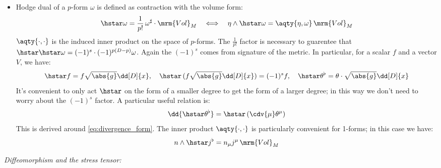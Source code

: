 \documentclass[a4paper
	,10pt
]{article}
\begin{document}
\begin{itemize}
	\item Hodge dual of a $p$-form $\omega$ is defined as contraction with the volume form:
	\begin{equation}
		\hstar\omega
		= \frac{1}{p!}\,
			\omega^\sharp \cdot \mrm{Vol}_M
	\quad\Longleftrightarrow\quad
		\eta\wedge \hstar\omega
		= \aqty{\eta,\omega} \,\mrm{Vol}_M
	\end{equation}
	$\aqty{\cdot,\cdot}$ is the induced inner product on the space of $p$-forms. 
	The $\frac{1}{p!}$ factor is necessary to guarentee that $\hstar\hstar\omega = (-1)^s\cdot(-1)^{p(D-p)} \omega$. Again the $(-1)^s$ comes from signature of the metric. In particular, for a scalar $f$ and a vector $V$, we have:
	\begin{equation}
		\hstar f
		= f\sqrt{\abs{g}} \dd[D]{x},
	\quad
		\hstar\,(f\sqrt{\abs{g}} \dd[D]{x})
		= (-1)^s f,
	\quad
		\hstar \theta^\flat
		= \theta\cdot \sqrt{\abs{g}} \dd[D]{x}
	\end{equation}
	It's convenient to only act $\hstar$ on the form of a smaller degree to get the form of a larger degree; in this way we don't need to worry about the $(-1)^s$ factor. 
	A particular useful relation is:
	\begin{equation}
		\dd{\hstar \theta^\flat}
		= \hstar\,(\cdv{\mu} \theta^\mu)
	\end{equation}
	This is derived around \eqref{eq:divergence_form}. The inner product $\aqty{\cdot,\cdot}$ is particularly convenient for 1-forms; in this case we have:
	\begin{equation}
		n \wedge\hstar j^\flat
		= n_\mu j^\mu \,\mrm{Vol}_M
	\end{equation}
	
	\end{itemize}
\textit{Diffeomorphism and the stress tensor:}
	
\end{document}
